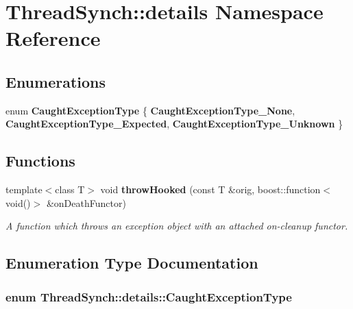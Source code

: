 \section{Thread\-Synch::details Namespace Reference}
\label{namespace_thread_synch_1_1details}


\subsection*{Enumerations}
\begin{CompactItemize}
\item 
enum {\bf Caught\-Exception\-Type} \{ {\bf Caught\-Exception\-Type\_\-None}, 
{\bf Caught\-Exception\-Type\_\-Expected}, 
{\bf Caught\-Exception\-Type\_\-Unknown}
 \}
\end{CompactItemize}
\subsection*{Functions}
\begin{CompactItemize}
\item 
template$<$class T$>$ void {\bf throw\-Hooked} (const T \&orig, boost::function$<$ void()$>$ \&on\-Death\-Functor)
\begin{CompactList}\small\item\em A function which throws an exception object with an attached on-cleanup functor. \item\end{CompactList}\end{CompactItemize}


\subsection{Enumeration Type Documentation}
\subsubsection{\setlength{\rightskip}{0pt plus 5cm}enum {\bf Thread\-Synch::details::Caught\-Exception\-Type}}\label{namespace_thread_synch_1_1details_f73d76ac70172e118a84433ebadd17c1}


